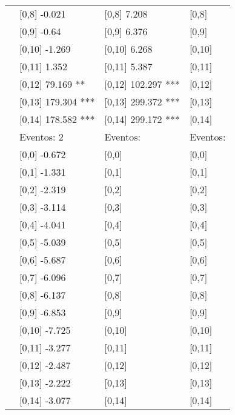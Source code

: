 \begin{table}
\begin{tabular}[t]{llll}
\addlinespace
 & {}[0,8] -0.021 & {}[0,8] 7.208 & {}[0,8]\\
 & {}[0,9] -0.64 & {}[0,9] 6.376 & {}[0,9]\\
 & {}[0,10] -1.269 & {}[0,10] 6.268 & {}[0,10]\\
 & {}[0,11] 1.352 & {}[0,11] 5.387 & {}[0,11]\\
 & {}[0,12] 79.169 ** & {}[0,12] 102.297 *** & {}[0,12]\\
\addlinespace
 & {}[0,13] 179.304 *** & {}[0,13] 299.372 *** & {}[0,13]\\
 & {}[0,14] 178.582 *** & {}[0,14] 299.172 *** & {}[0,14]\\
 & Eventos:  2 & Eventos: & Eventos:\\
 & {}[0,0] -0.672 & {}[0,0] & {}[0,0]\\
 & {}[0,1] -1.331 & {}[0,1] & {}[0,1]\\
\addlinespace
 & {}[0,2] -2.319 & {}[0,2] & {}[0,2]\\
 & {}[0,3] -3.114 & {}[0,3] & {}[0,3]\\
 & {}[0,4] -4.041 & {}[0,4] & {}[0,4]\\
 & {}[0,5] -5.039 & {}[0,5] & {}[0,5]\\
 & {}[0,6] -5.687 & {}[0,6] & {}[0,6]\\
\addlinespace
1000 & {}[0,7] -6.096 & {}[0,7] & {}[0,7]\\
 & {}[0,8] -6.137 & {}[0,8] & {}[0,8]\\
 & {}[0,9] -6.853 & {}[0,9] & {}[0,9]\\
 & {}[0,10] -7.725 & {}[0,10] & {}[0,10]\\
 & {}[0,11] -3.277 & {}[0,11] & {}[0,11]\\
\addlinespace
 & {}[0,12] -2.487 & {}[0,12] & {}[0,12]\\
 & {}[0,13] -2.222 & {}[0,13] & {}[0,13]\\
 & {}[0,14] -3.077 & {}[0,14] & {}[0,14]\\
\bottomrule
\end{tabular}
\end{table}
